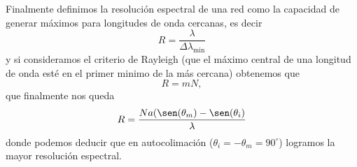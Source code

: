 \documentclass[a4paper,spanish]{article}
\numberwithin{equation}{section}
\begin{document}
		Finalmente definimos la resoluci\'on espectral de una red como la capacidad de generar m\'aximos para longitudes de onda cercanas, es decir
		\begin{equation}
			R = \frac{\lambda}{\Delta \lambda_{\text{min}}}
			\label{eq:difraccion_red_resolucion_espectral}
		\end{equation}
		y si consideramos el criterio de Rayleigh (que el m\'aximo central de una longitud de onda est\'e en el primer minimo de la m\'as cercana) obtenemos que \[R = m N,\] que finalmente nos queda
		\begin{equation}
			R = \frac{N a(\sen(\theta_m) - \sen(\theta_i)}{\lambda}
			\label{eq:difraccion_red_resolucion_rayleigh}
		\end{equation}
		donde podemos deducir que en autocolimaci\'on ($\theta_i = -\theta_m = 90^\circ$) logramos la mayor resoluci\'on espectral.
		
		
\end{document}
